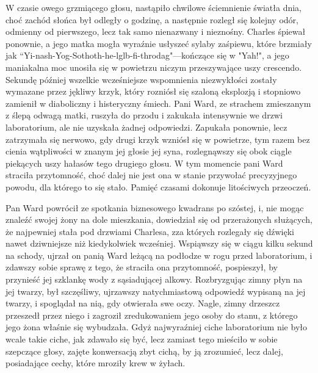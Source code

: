 W czasie owego grzmiącego głosu, nastąpiło chwilowe ściemnienie światła dnia, choć zachód słońca był odległy o godzinę, a następnie rozległ się kolejny odór, odmienny od pierwszego, lecz tak samo nienazwany i nieznośny. Charles śpiewał ponownie, a jego matka mogła wyraźnie usłyszeć sylaby zaśpiewu, które brzmiały jak ``Yi-nash-Yog-Sothoth-he-lglb-fi-throdag"—kończące się w "Yah!", a jego maniakalna moc unosiła się w powietrzu niczym przeszywające uszy crescendo. Sekundę później wszelkie wcześniejsze wspomnienia niezwykłości zostały wymazane przez jękliwy krzyk, który rozniósł się szaloną eksplozją i stopniowo zamienił w diaboliczny i histeryczny śmiech. Pani Ward, ze strachem zmieszanym z ślepą odwagą matki, ruszyła do przodu i zakukała intensywnie we drzwi laboratorium, ale nie uzyskała żadnej odpowiedzi. Zapukała ponownie, lecz zatrzymała się nerwowo, gdy drugi krzyk wzniósł się w powietrze, tym razem bez cienia wątpliwości w znanym jej głosie jej syna, rozlegnąwszy się obok ciągle piekących uszy hałasów tego drugiego głosu. W tym momencie pani Ward straciła przytomność, choć dalej nie jest ona w stanie przywołać precyzyjnego powodu, dla którego to się stało. Pamięć czasami dokonuje litościwych przeoczeń. 

Pan Ward powrócił ze spotkania biznesowego kwadrans po szóstej, i, nie mogąc znaleźć swojej żony na dole mieszkania, dowiedział się od przerażonych służących, że najpewniej stała pod drzwiami Charlesa, zza których rozlegały się dźwięki nawet dziwniejsze niż kiedykolwiek wcześniej. Wspiąwszy się w ciągu kilku sekund na schody, ujrzał on panią Ward leżącą na podłodze w rogu przed laboratorium, i zdawszy sobie sprawę z tego, że straciła ona przytomność, pospieszył, by przynieść jej szklankę wody z sąsiadującej alkowy. Rozbryzgując zimny płyn na jej twarzy, był szczęśliwy, ujrzawszy natychmiastową odpowiedź wypisaną na jej twarzy, i spoglądał na nią, gdy otwierała swe oczy. Nagle, zimny drzeszcz przeszedł przez niego i zagroził zredukowaniem jego osoby do stanu, z którego jego żona właśnie się wybudzała. Gdyż najwyraźniej ciche laboratorium nie było wcale takie ciche, jak zdawało się być, lecz zamiast tego mieściło w sobie szepczące głosy, zajęte konwersacją zbyt cichą, by ją zrozumieć, lecz dalej, posiadające cechy, które mroziły krew w żyłach. 

